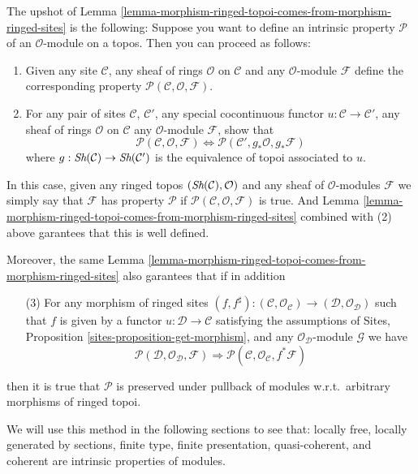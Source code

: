 \medskip\noindent
The upshot of
Lemma \ref{lemma-morphism-ringed-topoi-comes-from-morphism-ringed-sites}
is the following: Suppose you want to define
an intrinsic property $\mathcal{P}$ of an $\mathcal{O}$-module on a
topos. Then you can proceed as follows:
\begin{enumerate}
\item Given any site $\mathcal{C}$, any sheaf of rings $\mathcal{O}$
on $\mathcal{C}$ and any $\mathcal{O}$-module $\mathcal{F}$
define the corresponding
property $\mathcal{P}(\mathcal{C}, \mathcal{O}, \mathcal{F})$.
\item For any pair of sites $\mathcal{C}$, $\mathcal{C}'$, any
special cocontinuous functor $u : \mathcal{C} \to \mathcal{C}'$,
any sheaf of rings $\mathcal{O}$ on $\mathcal{C}$ any
$\mathcal{O}$-module $\mathcal{F}$, show that
$$
\mathcal{P}(\mathcal{C}, \mathcal{O}, \mathcal{F})
\Leftrightarrow
\mathcal{P}(\mathcal{C}', g_*\mathcal{O}, g_*\mathcal{F})
$$
where $g : \mathop{\textit{Sh}}\nolimits(\mathcal{C}) \to \mathop{\textit{Sh}}\nolimits(\mathcal{C}')$
is the equivalence of topoi associated to $u$.
\end{enumerate}
In this case, given any ringed topos $(\mathop{\textit{Sh}}\nolimits(\mathcal{C}), \mathcal{O})$
and any sheaf of $\mathcal{O}$-modules $\mathcal{F}$ we simply say that
$\mathcal{F}$ has property $\mathcal{P}$ if
$\mathcal{P}(\mathcal{C}, \mathcal{O}, \mathcal{F})$ is true.
And Lemma \ref{lemma-morphism-ringed-topoi-comes-from-morphism-ringed-sites}
combined with (2) above garantees that this is well defined.

\medskip\noindent
Moreover, the same
Lemma \ref{lemma-morphism-ringed-topoi-comes-from-morphism-ringed-sites}
also garantees that if in addition
\begin{enumerate}
\item[(3)] For any morphism of ringed sites
$(f, f^\sharp) :
(\mathcal{C}, \mathcal{O}_\mathcal{C})
\to
(\mathcal{D}, \mathcal{O}_\mathcal{D})$
such that $f$ is given by a functor
$u : \mathcal{D} \to \mathcal{C}$ satisfying the
assumptions of Sites, Proposition \ref{sites-proposition-get-morphism},
and any $\mathcal{O}_\mathcal{D}$-module $\mathcal{G}$
we have
$$
\mathcal{P}(\mathcal{D}, \mathcal{O}_\mathcal{D}, \mathcal{F})
\Rightarrow
\mathcal{P}(\mathcal{C}, \mathcal{O}_\mathcal{C}, f^*\mathcal{F})
$$
\end{enumerate}
then it is true that $\mathcal{P}$ is preserved under pullback
of modules w.r.t.\ arbitrary morphisms of ringed topoi.

\medskip\noindent
We will use this method in the following sections to see
that:
locally free,
locally generated by sections,
finite type,
finite presentation,
quasi-coherent, and
coherent
are intrinsic properties of modules.

